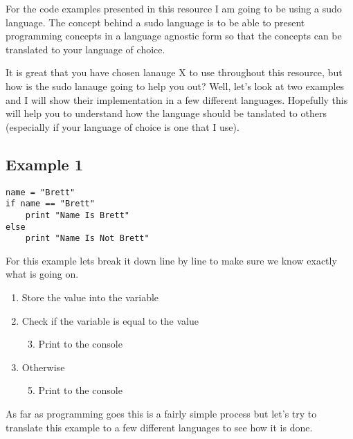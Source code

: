 For the code examples presented in this resource I am going to be using a sudo language.
The concept behind a sudo language is to be able to present programming concepts in a
language agnostic form so that the concepts can be translated to your language of choice.
\par

It is great that you have chosen lanauge X to use throughout this resource, but how is the sudo lanauge going to help you out?
Well, let's look at two examples and I will show their implementation in a few different languages.
Hopefully this will help you to understand how the language should be tanslated to others (especially if your language of choice is one that I use).

\subsection{Example 1}

\begin{lstlisting}[caption={Example 1 - Sudo Code}]
name = "Brett"
if name == "Brett"
    print "Name Is Brett"
else
    print "Name Is Not Brett"
\end{lstlisting}

For this example lets break it down line by line to make sure we know exactly what is going on.

\begin{enumerate}
    \item {Store the value  into the variable }
    \item {Check if the variable  is equal to the value }
    \begin{enumerate}
        \setcounter{enumii}{2}
        \item {Print  to the console}
    \end{enumerate}
    \setcounter{enumi}{3}
    \item {Otherwise}
    \begin{enumerate}
        \setcounter{enumii}{4}
        \item {Print  to the console}
    \end{enumerate}
\end{enumerate}

As far as programming goes this is a fairly simple process but let's try to translate this example to a few different languages to see how it is done.

